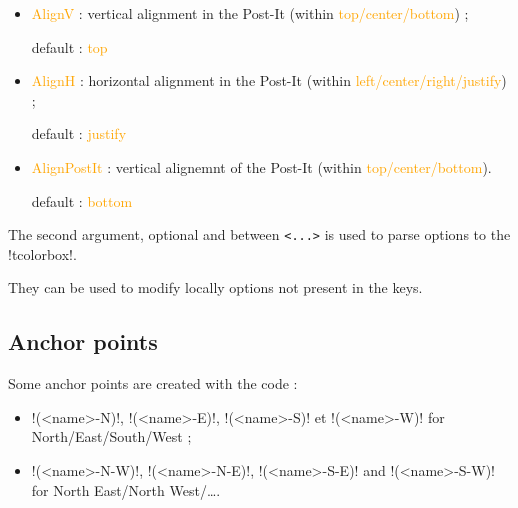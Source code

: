 \documentclass[english,a4paper,11pt]{article}
\newcommand\Cle[1]{{\small\sffamily\textlangle \textcolor{orange}{#1}\textrangle}}
\begin{document}
\begin{tipblock}
\begin{itemize}
	\hfill{}default : \Cle{0cm}
	\item \Cle{AlignV} : vertical alignment in the Post-It (within \Cle{top/center/bottom}) ;
	
	\hfill{}default : \Cle{top}
	\item \Cle{AlignH} : horizontal alignment in the Post-It (within \Cle{left/center/right/justify}) ;
	
	\hfill{}default : \Cle{justify}
	\item \Cle{AlignPostIt} : vertical alignemnt of the Post-It (within \Cle{top/center/bottom}).
	
	\hfill{}default : \Cle{bottom}
\end{itemize}
\vspace*{-\baselineskip}\leavevmode
\end{tipblock}

\begin{tipblock}
The second argument, optional and between \texttt{<...>} is used to parse options to the \motcletex!tcolorbox!.

They can be used to modify locally options not present in the keys.
\end{tipblock}

\subsection{Anchor points}

\begin{tipblock}
Some anchor points are created with the code :

\begin{itemize}
	\item \motcletex!(<name>-N)!, \motcletex!(<name>-E)!, \motcletex!(<name>-S)! et \motcletex!(<name>-W)! for North/East/South/West ;
	\item \motcletex!(<name>-N-W)!, \motcletex!(<name>-N-E)!, \motcletex!(<name>-S-E)! and \motcletex!(<name>-S-W)! for North East/North West/\ldots.
\end{itemize}
\end{tipblock}

\begin{DemoCode}[]
\begin{center}
\begin{PostItNote}[Rotate=10,Pin=None,Render=tikz,StorePostIt=MySmallNote1]
	\lipsum[1][1-2]
\end{PostItNote}
\end{center}
\end{DemoCode}
\end{document}
